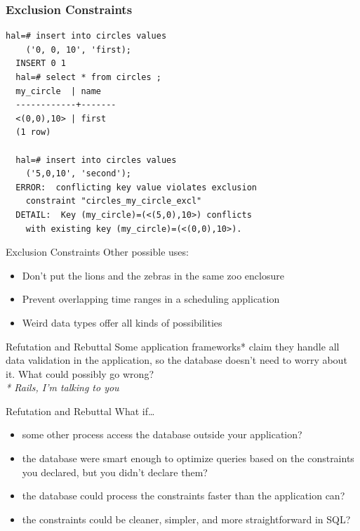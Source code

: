 \documentclass{beamer}
\begin{document}
\begin{frame}[fragile]
    \frametitle{Exclusion Constraints}
    \begin{Verbatim}[fontfamily=courier]
  hal=# insert into circles values
    ('0, 0, 10', 'first);
  INSERT 0 1
  hal=# select * from circles ;
  my_circle  | name
  ------------+-------
  <(0,0),10> | first
  (1 row)
  
  hal=# insert into circles values
    ('5,0,10', 'second');
  ERROR:  conflicting key value violates exclusion
    constraint "circles_my_circle_excl"
  DETAIL:  Key (my_circle)=(<(5,0),10>) conflicts
    with existing key (my_circle)=(<(0,0),10>).
    \end{Verbatim}
\end{frame}

\begin{frame}{Exclusion Constraints}
    Other possible uses:
    \begin{itemize}
        \item Don't put the lions and the zebras in the same zoo enclosure
        \item Prevent overlapping time ranges in a scheduling application
        \item Weird data types offer all kinds of possibilities
    \end{itemize}
\end{frame}

\begin{frame}{Refutation and Rebuttal}
    Some application frameworks{\color{red}*} claim they handle all data validation in the application, so the database doesn't need to worry about it. What could possibly go wrong?
    \\
    \vspace{0.5\textheight}
    {\footnotesize \color{red} \emph{* Rails, I'm talking to you}}
\end{frame}

\begin{frame}{Refutation and Rebuttal}
    What if\ldots
    \begin{itemize}
        \item some other process access the database outside your application?
        \item the database were smart enough to optimize queries based on the constraints you declared, but you didn't declare them?
        \item the database could process the constraints faster than the application can?
        \item the constraints could be cleaner, simpler, and more straightforward in SQL?
    \end{itemize}
\end{frame}
\end{document}
